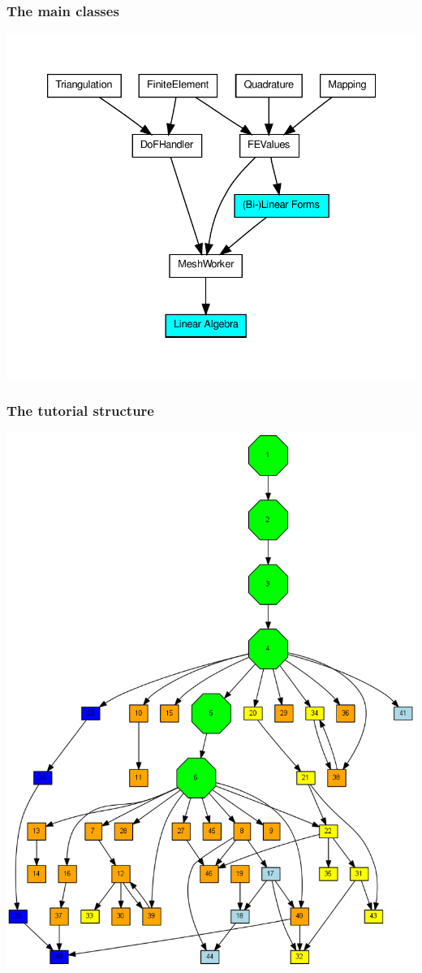 \begin{frame}
  \frametitle{The main classes}
  \centering
  \includegraphics[height=.99\textheight]{graph/structure}
\end{frame}

\begin{frame}
  \frametitle{The tutorial structure}

  \centering
  \includegraphics[height=.99\textheight]{graph/tutorial}

\end{frame}



